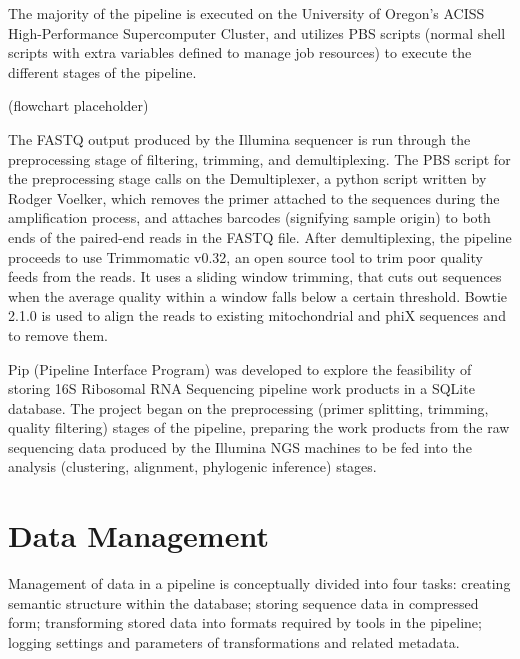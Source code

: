 \documentclass[12pt]{article}
\begin{document}

	The majority of the pipeline is executed on the University of Oregon’s ACISS High-Performance Supercomputer Cluster, and utilizes PBS scripts (normal shell scripts with extra variables defined to manage job resources) to execute the different stages of the pipeline.

	(flowchart placeholder)

	The FASTQ output produced by the Illumina sequencer is run through the preprocessing stage of filtering, trimming, and demultiplexing. The PBS script for the preprocessing stage calls on the Demultiplexer, a python script written by Rodger Voelker, which removes the primer attached to the sequences during the amplification process, and attaches barcodes (signifying sample origin) to both ends of the paired-end reads in the FASTQ file. After demultiplexing, the pipeline proceeds to use Trimmomatic v0.32, an open source tool to trim poor quality feeds from the reads. It uses a sliding window trimming, that cuts out sequences when the average quality within a window falls below a certain threshold. 
	Bowtie 2.1.0 is used to align the reads to existing mitochondrial and phiX sequences and to remove them.
	
	Pip (Pipeline Interface Program) was developed to explore the feasibility of 
	storing 16S Ribosomal RNA Sequencing pipeline work products in a SQLite database.
	The project began on the preprocessing (primer splitting, trimming, quality filtering) 
	stages of the pipeline, preparing the work products from the raw sequencing 
	data produced by the Illumina NGS machines to be fed into the analysis (clustering, alignment, phylogenic inference) 
	stages. 
	
	\section{Data Management} %
	\label{sec:data_management}
	Management of data in a pipeline is conceptually divided into four tasks: 
	creating semantic structure within the database; storing sequence data in compressed form;
	transforming stored data into formats required by tools in the pipeline; logging
	settings and parameters of transformations and related metadata.
	
\end{document}
